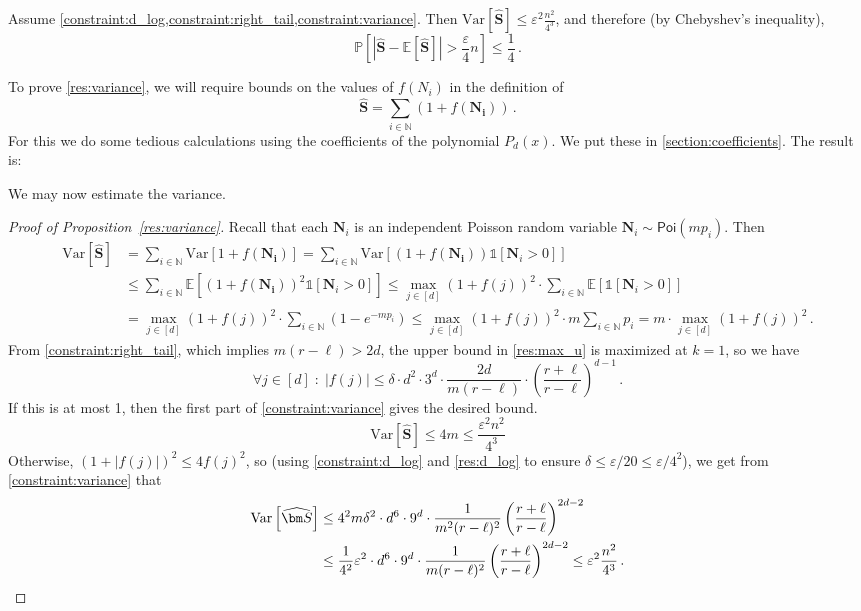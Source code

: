 \documentclass{theoretics}
\makeatletter
\newcommand\IfRestateTF{%
  \ifx\label\thmt@gobble@label %
    \expandafter\@firstoftwo
  \else
    \expandafter\@secondoftwo
  \fi
}
\newcommand{\RestateRemark}{\IfRestateTF{{\normalfont\bfseries (Restated) }}{}}
\newcommand{\Var}[1]{\mathrm{Var} \left[ #1 \right]}
\newcommand{\Ex}[1]{\bE \left[ #1 \right]}
\renewcommand{\Pr}[1]{\bP \left[ #1 \right]} %
\newcommand{\ind}[1]{\mathds{1} \left[ #1 \right] }
\newcommand{\bE}{\ensuremath{\mathbb{E}}}
\newcommand{\bN}{\ensuremath{\mathbb{N}}}
\newcommand{\bP}{\ensuremath{\mathbb{P}}}
\newcommand{\Poi}{\mathsf{Poi}}
\renewcommand{\epsilon}{\varepsilon}
\makeatother
\begin{document}
\begin{proposition}
\label{res:variance}
Assume \cref{constraint:d_log,constraint:right_tail,constraint:variance}. Then
$\Var{\widehat{\bm S}} \leq \epsilon^2 \frac{n^2}{4^3}$,
and therefore (by Chebyshev's inequality),
\[
  \Pr{ |\widehat{\bm S} - \Ex{\widehat{\bm S}}| > \frac{\epsilon}{4} n }
  \leq \frac{1}{4} \,.
\]
\end{proposition}

To prove \cref{res:variance}, we will require bounds on the values of $f(N_i)$ in the definition of
\[
  \widehat{\bm S} = \sum_{i \in \bN} ( 1 + f(\bm{N_i}) ) \,.
\]
For this we do some tedious calculations using the coefficients of the polynomial $P_d(x)$. We put
these in \cref{section:coefficients}. The result is:

We may now estimate the variance.

\begin{proof}[Proof of Proposition~\ref{res:variance}]
Recall that each $\bm{N}_i$ is an independent Poisson random variable $\bm{N}_i \sim \Poi(mp_i)$.
Then
\begin{align*}
\Var{\bm{\widehat S}}
&= \sum_{i \in \bN} \Var{1+f(\bm{N_i})}
= \sum_{i \in \bN} \Var{(1+f(\bm{N_i})) \ind{\bm{N}_i > 0}} \\
&\leq \sum_{i \in \bN} \Ex{(1+ f(\bm{N_i}) )^2 \ind{\bm{N}_i > 0}} 
\leq \max_{j \in [d]} (1+ f(j) )^2 \cdot  \sum_{i \in \bN} \Ex{\ind{\bm{N}_i > 0}} \\
&= \max_{j \in [d]} (1+f(j) )^2 \cdot \sum_{i \in \bN} (1 - e^{-mp_i}) 
\leq \max_{j \in [d]} (1+ f(j) )^2 \cdot m \sum_{i \in \bN} p_i
= m \cdot \max_{j \in [d]} (1+ f(j) )^2 \,.
\end{align*}
From \cref{constraint:right_tail}, which implies $m(r-\ell) > 2d$, the upper bound in
\cref{res:max_u} is maximized at $k=1$, so we have
\[
\forall j \in [d] \;:\; |f(j)| \leq \delta \cdot d^2 \cdot 3^d \cdot \frac{2d}{m(r-\ell)} \cdot
\left(\frac{r+\ell}{r-\ell}\right)^{d-1} \,.
\]
If this is at most 1, then the first part of \cref{constraint:variance} gives the desired bound.
\[
  \Var{\widehat{\bm S}} \leq 4m \leq \frac{\epsilon^2 n^2}{4^3}
\]
Otherwise, $(1+|f(j)|)^2 \leq 4f(j)^2$, so (using \cref{constraint:d_log} and \cref{res:d_log} to
ensure $\delta \leq \epsilon/20 \le \epsilon/4^2$), we get from \cref{constraint:variance} that
\begin{align*}
  \Var{\widehat{\bm S}}
  &\leq 4^2 m \delta^2 \cdot d^6 \cdot 9^d \cdot \frac{1}{m^2(r-\ell)^2} \left( \frac{r+\ell}{r-\ell}
\right)^{2d-2}  \\
  &\leq \frac{1}{4^2} \epsilon^2 \cdot d^6 \cdot 9^d \cdot \frac{1}{m(r-\ell)^2} \left( \frac{r+\ell}{r-\ell}
\right)^{2d-2} 
  \leq \epsilon^2 \frac{n^2}{4^3} \,. \qedhere
\end{align*}
\end{proof}
\end{document}
